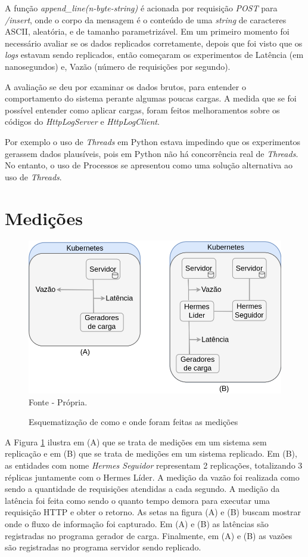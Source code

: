 A função \textit{append\_line(n-byte-string)} é acionada por requisição \textit{POST} para \textit{/insert}, onde o corpo da mensagem é o conteúdo de uma \textit{string} de caracteres \gls{ASCII}, aleatória, e de tamanho parametrizável.
Em um primeiro momento foi necessário avaliar se os dados replicados corretamente, depois que foi visto que os \textit{logs} estavam sendo replicados, então começaram os experimentos de Latência (em nanosegundos) e, Vazão (número de requisições por segundo).

A avaliação se deu por examinar os dados brutos, para entender o comportamento do sistema perante algumas poucas cargas. A medida que se foi possível entender como aplicar cargas, foram feitos melhoramentos sobre os códigos do \textit{HttpLogServer} e \textit{HttpLogClient}.

Por exemplo o uso de \textit{Threads} em Python estava impedindo que os experimentos gerassem dados plausíveis, pois em Python não há concorrência real de \textit{Threads}. No entanto, o uso de Processos se apresentou como uma solução alternativa ao uso de \textit{Threads}.

\section{Medições}

\begin{figure}[htb!]
\centering
\caption{Esquematização de como e onde foram feitas as medições}
\includegraphics[width=0.8\linewidth]{figures/medicoes-configs.drawio.png}
{\flushleft Fonte - Própria.}
\label{fig:experimento-medicoes}
\end{figure}

A Figura \ref{fig:experimento-medicoes} ilustra em (A) que se trata de medições em um sistema sem replicação e em (B) que se trata de medições em um sistema replicado. Em (B), as entidades com nome \textit{Hermes Seguidor} representam 2 replicações, totalizando 3 réplicas juntamente com o Hermes Líder. A medição da vazão foi realizada como sendo a quantidade de requisições atendidas a cada segundo. A medição da latência foi feita como sendo o quanto tempo demora para executar uma requisição \gls{HTTP} e obter o retorno. As setas na figura (A) e (B) buscam mostrar onde o fluxo de informação foi capturado. Em (A) e (B) as latências são registradas no programa gerador de carga. Finalmente, em (A) e (B) as vazões são registradas no programa servidor sendo replicado.

